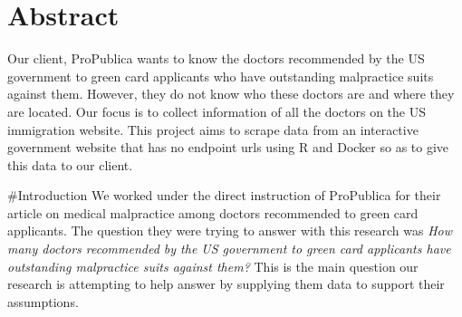 \documentclass[10pt,letterpaper]{article}
\newcommand{\getIndex}[2]{
  \ForEach{,}{\IfEq{#1}{\thislevelitem}{\number\thislevelcount\ExitForEach}{}}{#2}
}
\newcommand{\getAff}[1]{
  \getIndex{#1}{}
}
\begin{document}
\vspace*{0.2in}

\section*{Abstract}
Our client, ProPublica wants to know the doctors recommended by the US
government to green card applicants who have outstanding malpractice
suits against them. However, they do not know who these doctors are and
where they are located. Our focus is to collect information of all the
doctors on the US immigration website. This project aims to scrape data
from an interactive government website that has no endpoint urls using R
and Docker so as to give this data to our client.


\linenumbers

\#Introduction We worked under the direct instruction of ProPublica for
their article on medical malpractice among doctors recommended to green
card applicants. The question they were trying to answer with this
research was \emph{How many doctors recommended by the US government to
green card applicants have outstanding malpractice suits against them?}
This is the main question our research is attempting to help answer by
supplying them data to support their assumptions.
\end{document}
